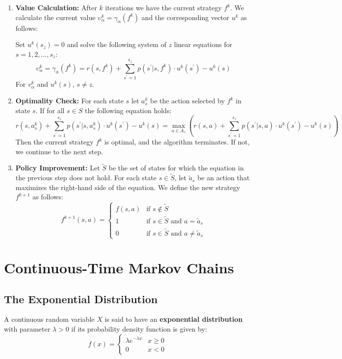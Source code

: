 \documentclass[12pt]{article}
\begin{document}
\begin{enumerate}
    \item \textbf{Value Calculation:} After $k$ iterations we have the current strategy $f^k$. We calculate the current value $\upsilon_\alpha^k = \gamma_\alpha(f^k)$ and the corresponding vector $u^k$ as follows:
    
    Set $u^k(s_z) = 0$ and solve the following system of $z$ linear equations for $s = 1, 2, ... , s_z$:
    \[ \upsilon_\alpha^k = \gamma_\alpha(f^k) = r(s, f^k) + \sum_{s^\prime = 1}^{s_z} p(s^\prime | s, f^k) \cdot u^k(s^\prime) - u^k(s) \]
    For $v_\alpha^k$ and $u^k(s)$, $s \neq z$.
    \item \textbf{Optimality Check:} For each state $s$ let $a_s^k$ be the action selected by $f^k$ in state $s$. If for all $s \in S$ the following equation holds:
    \[ r(s, a_s^k) + \sum_{s^\prime = 1}^{s_z} p(s^\prime | s, a_s^k) \cdot u^k(s^\prime) - u^k(s) = \max_{a \in A_s} \left( r(s, a) + \sum_{s^\prime = 1}^{s_z} p(s^\prime | s, a) \cdot u^k(s^\prime) - u^k(s) \right) \]
    Then the current strategy $f^k$ is optimal, and the algorithm terminates. If not, we continue to the next step.
    \item \textbf{Policy Improvement:} Let $\tilde{S}$ be the set of states for which the equation in the previous step does not hold. For each state $s \in \tilde{S}$, let $\tilde{a}_s$ be an action that maximizes the right-hand side of the equation. We define the new strategy $f^{k + 1}$ as follows:
    \[ f^{k + 1}(s, a) = \begin{cases}
        f(s, a) & \text{if } s \notin \tilde{S} \\
        1 & \text{if } s \in \tilde{S} \text{ and } a = \tilde{a}_s \\
        0 & \text{if } s \in \tilde{S} \text{ and } a \neq \tilde{a}_s
    \end{cases} \]
\end{enumerate}

%
%
\newpage
\section{Continuous-Time Markov Chains}
\subsection{The Exponential Distribution}
A continuous random variable $X$ is said to have an \textbf{exponential distribution} with parameter $\lambda > 0$ if its probability density function is given by:
\[ f(x) = \begin{cases}
    \lambda e^{-\lambda x} & x \geq 0 \\
    0 & x < 0
\end{cases} \]
\end{document}
